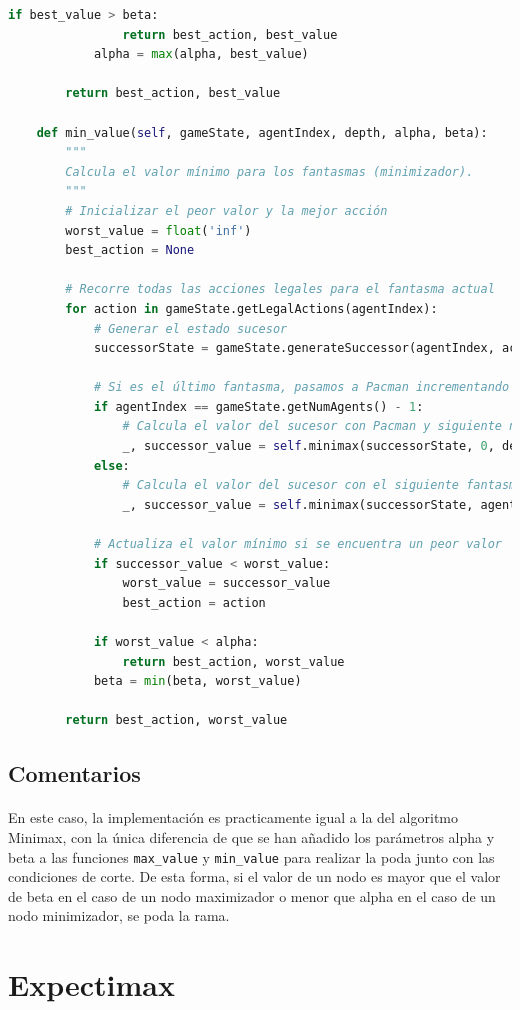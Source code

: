 \documentclass{report}
\begin{document}
\begin{lstlisting}[language=Python, caption=Implementación final del agente Alpha-Beta]
            if best_value > beta:
                return best_action, best_value
            alpha = max(alpha, best_value)

        return best_action, best_value

    def min_value(self, gameState, agentIndex, depth, alpha, beta):
        """
        Calcula el valor mínimo para los fantasmas (minimizador).
        """
        # Inicializar el peor valor y la mejor acción
        worst_value = float('inf')
        best_action = None

        # Recorre todas las acciones legales para el fantasma actual
        for action in gameState.getLegalActions(agentIndex):
            # Generar el estado sucesor
            successorState = gameState.generateSuccessor(agentIndex, action)
            
            # Si es el último fantasma, pasamos a Pacman incrementando la profundidad
            if agentIndex == gameState.getNumAgents() - 1:
                # Calcula el valor del sucesor con Pacman y siguiente nivel de profundidad
                _, successor_value = self.minimax(successorState, 0, depth + 1, alpha, beta)
            else:
                # Calcula el valor del sucesor con el siguiente fantasma
                _, successor_value = self.minimax(successorState, agentIndex + 1, depth, alpha, beta)

            # Actualiza el valor mínimo si se encuentra un peor valor
            if successor_value < worst_value:
                worst_value = successor_value
                best_action = action
                
            if worst_value < alpha:
                return best_action, worst_value
            beta = min(beta, worst_value)

        return best_action, worst_value
            \end{lstlisting}
        \subsection*{Comentarios}
          \paragraph*{}{
            En este caso, la implementación es practicamente igual a la del algoritmo Minimax, con la única diferencia de que se han añadido los parámetros alpha y beta a las funciones \texttt{max\_value} y \texttt{min\_value} para realizar la poda junto con las condiciones de corte.
            De esta forma, si el valor de un nodo es mayor que el valor de beta en el caso de un nodo maximizador o menor que alpha en el caso de un nodo minimizador, se poda la rama.
          }
      \clearpage\section{Expectimax} %
\end{document}
